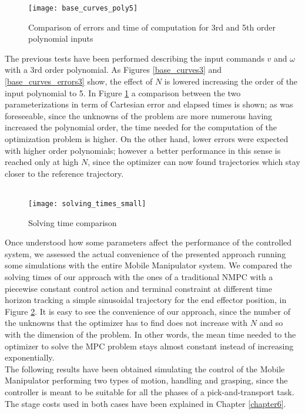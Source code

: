\begin{figure}[h!]
\centering
\texttt{[image: base\_curves\_poly5]}
\caption{Comparison of errors and time of computation for 3rd and 5th order polynomial inputs}
\label{base_curves_poly5}
\end{figure}
The previous tests have been performed describing the input commands $v$ and $\omega$ with a 3rd order polynomial. As Figures \ref{base_curves3} and \ref{base_curves_errors3} show, the effect of $N$ is lowered increasing the order of the input polynomial to 5. In Figure \ref{base_curves_poly5} a comparison between the two parameterizations in term of Cartesian error and elapsed times is shown; as was foreseeable, since the unknowns of the problem are more numerous having increased the polynomial order, the time needed for the computation of the optimization problem is higher. On the other hand, lower errors were expected with higher order polynomials; however a better performance in this sense is reached only at high $N$, since the optimizer can now found trajectories which stay closer to the reference trajectory.
\\\\
\begin{figure}[h!]
\centering
\texttt{[image: solving\_times\_small]}
\caption{Solving time comparison}
\label{solving_times}
\end{figure}
Once understood how some parameters affect the performance of the controlled system, we assessed the actual convenience of the presented approach running some simulations with the entire Mobile Manipulator system. We compared the solving times of our approach with the ones of a traditional NMPC with a piecewise constant control action and terminal constraint at different time horizon tracking a simple sinusoidal trajectory for the end effector position, in Figure \ref{solving_times}. It is easy to see the convenience of our approach, since the number of the unknowns that the optimizer has to find does not increase with $N$ and so with the dimension of the problem. In other words, the mean time needed to the optimizer to solve the MPC problem stays almost constant instead of increasing exponentially.\\
The following results have been obtained simulating the control of the Mobile Manipulator performing two types of motion, handling and grasping, since the controller is meant to be suitable for all the phases of a pick-and-transport task. The stage costs used in both cases have been explained in Chapter \ref{chapter6}.

